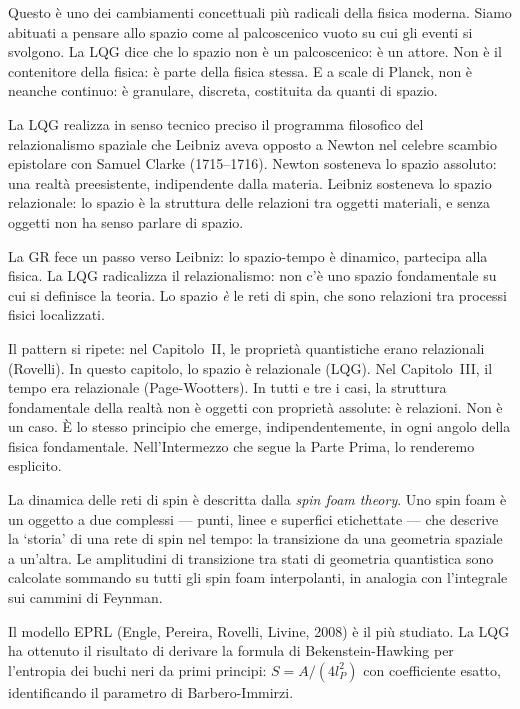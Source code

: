 \documentclass[12pt,a4paper,openany]{book}
\newcommand{\sezione}[1]{\vspace{1.2em}{\large\bfseries #1}\vspace{0.5em}\par}
\begin{document}
Questo è uno dei cambiamenti concettuali più radicali della fisica moderna. Siamo abituati a pensare allo spazio come al palcoscenico vuoto su cui gli eventi si svolgono. La LQG dice che lo spazio non è un palcoscenico: è un attore. Non è il contenitore della fisica: è parte della fisica stessa. E a scale di Planck, non è neanche continuo: è granulare, discreta, costituita da quanti di spazio.

\sezione{Il relazionalismo spaziale: Leibniz realizzato}

La LQG realizza in senso tecnico preciso il programma filosofico del relazionalismo spaziale che Leibniz aveva opposto a Newton nel celebre scambio epistolare con Samuel Clarke (1715--1716). Newton sosteneva lo spazio assoluto: una realtà preesistente, indipendente dalla materia. Leibniz sosteneva lo spazio relazionale: lo spazio è la struttura delle relazioni tra oggetti materiali, e senza oggetti non ha senso parlare di spazio.

La GR fece un passo verso Leibniz: lo spazio-tempo è dinamico, partecipa alla fisica. La LQG radicalizza il relazionalismo: non c'è uno spazio fondamentale su cui si definisce la teoria. Lo spazio \textit{è} le reti di spin, che sono relazioni tra processi fisici localizzati.

Il pattern si ripete: nel Capitolo~II, le proprietà quantistiche erano relazionali (Rovelli). In questo capitolo, lo spazio è relazionale (LQG). Nel Capitolo~III, il tempo era relazionale (Page-Wootters). In tutti e tre i casi, la struttura fondamentale della realtà non è oggetti con proprietà assolute: è relazioni. Non è un caso. È lo stesso principio che emerge, indipendentemente, in ogni angolo della fisica fondamentale. Nell'Intermezzo che segue la Parte Prima, lo renderemo esplicito.

\sezione{La dinamica: spin foam e amplitudini di transizione}

La dinamica delle reti di spin è descritta dalla \textit{spin foam theory}. Uno spin foam è un oggetto a due complessi — punti, linee e superfici etichettate — che descrive la `storia' di una rete di spin nel tempo: la transizione da una geometria spaziale a un'altra. Le amplitudini di transizione tra stati di geometria quantistica sono calcolate sommando su tutti gli spin foam interpolanti, in analogia con l'integrale sui cammini di Feynman.

Il modello EPRL (Engle, Pereira, Rovelli, Livine, 2008) è il più studiato. La LQG ha ottenuto il risultato di derivare la formula di Bekenstein-Hawking per l'entropia dei buchi neri da primi principi: $S = A/(4l_P^2)$ con coefficiente esatto, identificando il parametro di Barbero-Immirzi.
\end{document}
